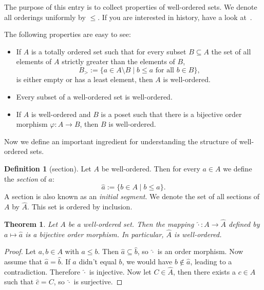 \documentclass[12pt]{article}
\newcommand{\<}{\langle}
\renewcommand{\>}{\rangle}
\newcommand{\h}{\widehat}
\begin{document}
\newtheorem{thm}{Theorem}
\theoremstyle{definition}
\newtheorem{defn}{Definition}
The purpose of this entry is to collect properties of well-ordered
sets. We denote all orderings uniformly by $\leq$. If you are
interested in history, have a look at~\cite{C}.

The following properties are easy to see:
\begin{itemize}
\item If $A$ is a totally ordered set such that for every subset
  $B\subseteq A$ the set of all elements of $A$ strictly greater than
  the elements of $B$,
\begin{equation*}
B_>:=\{a\in A\setminus B\mid b\leq a\text{ for all }b\in B\},
\end{equation*}
is either empty or has a least element, then $A$ is well-ordered.
\item Every subset of a well-ordered set is well-ordered.
\item If $A$ is well-ordered and $B$ is a poset such that there is a
  bijective order morphism $\varphi\colon A\to B$, then $B$ is
  well-ordered.
\end{itemize}

Now we define an important ingredient for understanding the structure
of well-ordered sets.

\begin{defn}[section]
Let $A$ be well-ordered. Then for every $a\in A$ we define the
\emph{section} of $a$:
\begin{equation*}
\h{a}:=\{b\in A\mid b\leq a\}.
\end{equation*}
A section is also known as an \emph{initial segment}.  We denote the set of all sections of $A$ by $\h{A}$. This set is
ordered by inclusion.
\end{defn}

\begin{thm}
\label{thm:AtosectionsofA}
Let $A$ be a well-ordered set.  Then the mapping $\h{\cdot}\colon
A\to\h{A}$ defined by $a\mapsto\h{a}$ is a bijective order morphism.
In particular, $\h{A}$ is well-ordered.
\end{thm}
\begin{proof}
Let $a,b\in A$ with $a\leq b$. Then $\h{a}\subseteq\h{b}$, so
$\h{\cdot}$ is an order morphism. Now assume that $\h{a}=\h{b}$. If
$a$ didn't equal $b$, we would have $b\notin\h{a}$, leading to a
contradiction. Therefore $\h{\cdot}$ is injective. Now let
$C\in\h{A}$, then there exists a $c\in A$ such that $\h{c}=C$, so
$\h{\cdot}$ is surjective.
\end{proof}
\end{document}
